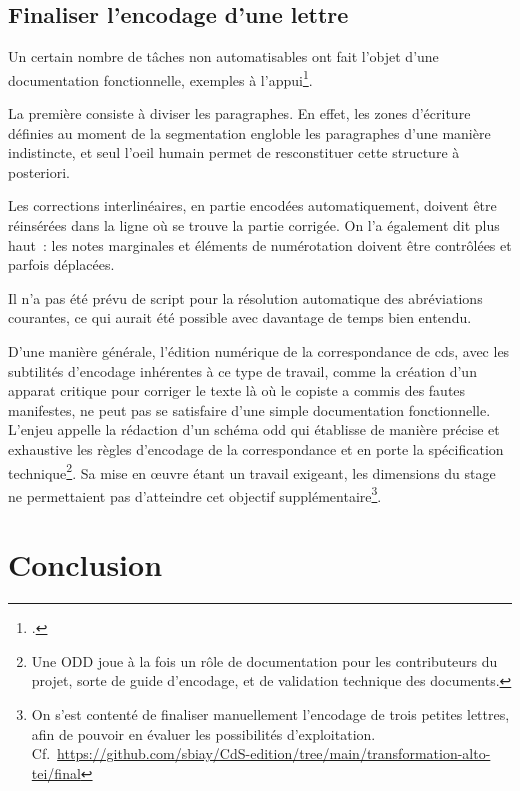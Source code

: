 \documentclass[a4paper,12pt,twoside]{book}
\begin{document}
		\section{Finaliser l'encodage d'une lettre}
		
			Un certain nombre de tâches non automatisables ont fait l'objet d'une documentation fonctionnelle, exemples à l'appui\footcite{biayFinaliserEncodageLettre2022}.
			
			La première consiste à diviser les paragraphes. En effet, les zones d'écriture définies au moment de la \gls{segmentation} engloble les paragraphes d'une manière indistincte, et seul l'oeil humain permet de resconstituer cette structure à posteriori.
			
			Les corrections interlinéaires, en partie encodées automatiquement, doivent être réinsérées dans la ligne où se trouve la partie corrigée. On l'a également dit plus haut~: les notes marginales et éléments de numérotation doivent être contrôlées et parfois déplacées.
			
			Il n'a pas été prévu de script pour la résolution automatique des abréviations courantes, ce qui aurait été possible avec davantage de temps bien entendu. 
			
			D'une manière générale, l'édition numérique de la correspondance de \gls{cds}, avec les subtilités d'encodage inhérentes à ce type de travail, comme la création d'un apparat critique pour corriger le texte là où le copiste a commis des fautes manifestes, ne peut pas se satisfaire d'une simple documentation fonctionnelle. L'enjeu appelle la rédaction d'un schéma \gls{odd} qui établisse de manière précise et exhaustive les règles d'encodage de la correspondance et en porte la spécification technique\footnote{Une ODD joue à la fois un rôle de documentation pour les contributeurs du projet, sorte de guide d'encodage, et de validation technique des documents.}. Sa mise en œuvre étant un travail exigeant, les dimensions du stage ne permettaient pas d'atteindre cet objectif supplémentaire\footnote{On s'est contenté de finaliser manuellement l'encodage de trois petites lettres, afin de pouvoir en évaluer les possibilités d'exploitation. Cf.~\url{https://github.com/sbiay/CdS-edition/tree/main/transformation-alto-tei/final}}.
		
	\pagestyle{empty}
	\cleardoublepage
	\pagestyle{plain}			
		
	\chapter*{Conclusion}
		
\end{document}
